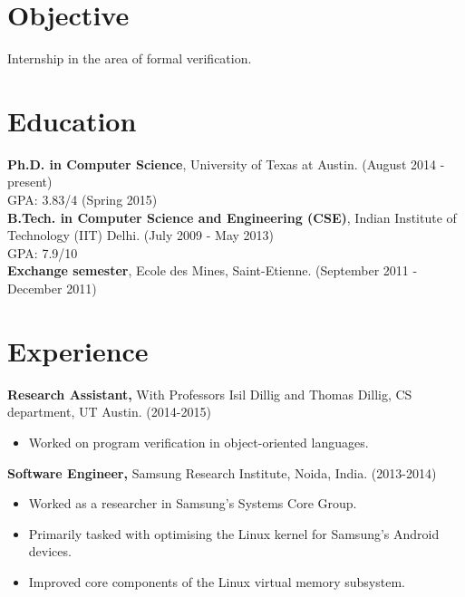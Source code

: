 \documentclass[margin]{res}
\begin{document}
 
 
 
\address{Department of Computer Science \\University of Texas at Austin \\ Austin, TX 78712  \\
        +1 512-952-0104 \\ mihir@cs.utexas.edu }

 
\begin{resume} 
 
\section{Objective} 
Internship in the area of formal verification.

\section{Education} 
{\bf Ph.D. in Computer Science}, University of Texas at Austin. \hfill (August 2014 - present)\\
GPA: 3.83/4 \hfill (Spring 2015)\\
{\bf B.Tech. in Computer Science and Engineering (CSE)}, Indian Institute of
Technology (IIT) Delhi. \hfill (July 2009 - May 2013)\\
GPA: 7.9/10\\
{\bf Exchange semester}, Ecole des Mines, Saint-Etienne. \hfill (September
2011 - December 2011)

\section{Experience}

 {\bf Research Assistant,} With Professors Isil Dillig and Thomas
 Dillig, CS department, UT Austin. \hfill (2014-2015)
 \begin{itemize} \itemsep -2pt  %
 \item Worked on program verification in object-oriented languages.
 \end{itemize}
 
 {\bf Software Engineer,} Samsung Research Institute, Noida, India. \hfill (2013-2014)
 \begin{itemize} \itemsep -2pt  %
 \item Worked as a researcher in Samsung's Systems Core Group.
 \item Primarily tasked with optimising the Linux kernel for Samsung's
   Android devices.
 \item Improved core components of the Linux virtual memory subsystem.
 \end{itemize}


\end{resume}
\end{document}

